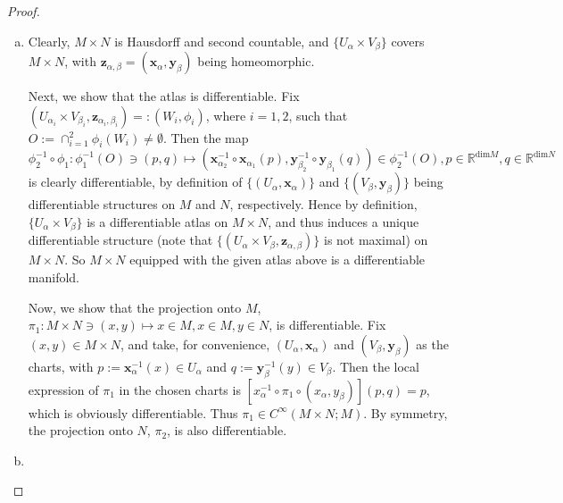 \begin{proof}
\begin{enumerate}[(a)]
	\item
	Clearly, $M \times N$ is Hausdorff and second countable, and $\{U_\alpha \times V_\beta\}$ covers $M \times N$, with $\mathbf{z}_{\alpha,\beta}=(\mathbf{x}_\alpha,\mathbf{y}_\beta)$ being homeomorphic.
	\par
	Next, we show that the atlas is differentiable. Fix $(U_{\alpha_i} \times V_{\beta_i}, \mathbf{z}_{\alpha_i,\beta_i}) =: (W_i,\phi_i)$, where $i=1,2$, such that $O := \cap_{i=1}^2 \phi_i(W_i) \ne \emptyset$. Then the map $\phi_2^{-1} \circ \phi_1: \phi_1^{-1}(O) \ni (p,q) \mapsto \left(\mathbf{x}_{\alpha_2}^{-1} \circ \mathbf{x}_{\alpha_1}(p), \mathbf{y}_{\beta_2}^{-1} \circ \mathbf{y}_{\beta_1}(q)\right) \in \phi_2^{-1}(O), p\in\mathbb{R}^{\mathrm{dim }M}, q\in\mathbb{R}^{\mathrm{dim }N}$ is clearly differentiable, by definition of $\{(U_\alpha,\mathbf{x}_\alpha)\}$ and $\{(V_\beta,\mathbf{y}_\beta)\}$ being differentiable structures on $M$ and $N$, respectively. Hence by definition, $\{U_\alpha \times V_\beta\}$ is a differentiable atlas on $M \times N$, and thus induces a unique differentiable structure (note that $\{(U_\alpha \times V_\beta,\mathbf{z}_{\alpha,\beta})\}$ is not maximal) on $M \times N$. So $M \times N$ equipped with the given atlas above is a differentiable manifold.
	\par
	Now, we show that the projection onto $M$, $\pi_1: M \times N \ni (x,y) \mapsto x \in M, x \in M, y \in N$, is differentiable. Fix $(x,y) \in M \times N$, and take, for convenience, $(U_\alpha, \mathbf{x}_\alpha)$ and $(V_\beta, \mathbf{y}_\beta)$ as the charts, with $p:= \mathbf{x}_\alpha^{-1}(x) \in U_\alpha$ and $q:= \mathbf{y}_\beta^{-1}(y) \in V_\beta$. Then the local expression of $\pi_1$ in the chosen charts is $\left[x_\alpha^{-1} \circ \pi_1 \circ (x_\alpha, y_\beta)\right](p,q) = p$, which is obviously differentiable. Thus $\pi_1 \in C^\infty(M \times N; M)$.	By symmetry, the projection onto $N$, $\pi_2$, is also differentiable.
	
	\item
	
	
\end{enumerate}
\end{proof}